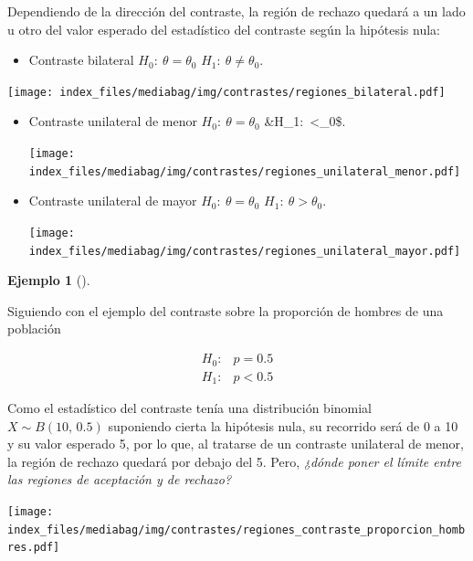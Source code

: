 \documentclass[
  a4paper,
]{scrreport}
\providecommand{\tightlist}{%
  \setlength{\itemsep}{0pt}\setlength{\parskip}{0pt}}\usepackage{longtable,booktabs,array}
\theoremstyle{plain}
\theoremstyle{definition}
\newtheorem{example}{Ejemplo}[chapter]
\theoremstyle{definition}
\theoremstyle{remark}
\begin{document}
Dependiendo de la dirección del contraste, la región de rechazo quedará
a un lado u otro del valor esperado del estadístico del contraste según
la hipótesis nula:

\begin{itemize}
\tightlist
\item
  Contraste bilateral \(H_0:\ \theta=\theta_0\)
  \(H_1:\ \theta\neq\theta_0\).
\end{itemize}

\begin{center}
\texttt{[image: index\_files/mediabag/img/contrastes/regiones\_bilateral.pdf]}
\end{center}

\begin{itemize}
\item
  Contraste unilateral de menor \(H_0:\ \theta=\theta_0\)
  \&H\_1:~\theta\textless{}\theta\_0\$. \begin{center}
  \texttt{[image: index\_files/mediabag/img/contrastes/regiones\_unilateral\_menor.pdf]}
  \end{center}
\item
  Contraste unilateral de mayor \(H_0:\ \theta=\theta_0\)
  \(H_1:\ \theta>\theta_0\). \begin{center}
  \texttt{[image: index\_files/mediabag/img/contrastes/regiones\_unilateral\_mayor.pdf]}
  \end{center}
\end{itemize}

\begin{example}[]\protect\hypertarget{exm-regiones-aceptacion-rechazo}{}\label{exm-regiones-aceptacion-rechazo}

Siguiendo con el ejemplo del contraste sobre la proporción de hombres de
una población

\begin{align*}
H_0: & p=0.5 \\
H_1: & p<0.5
\end{align*}

Como el estadístico del contraste tenía una distribución binomial
\(X\sim B(10,\,0.5)\) suponiendo cierta la hipótesis nula, su recorrido
será de 0 a 10 y su valor esperado 5, por lo que, al tratarse de un
contraste unilateral de menor, la región de rechazo quedará por debajo
del 5. Pero, \emph{¿dónde poner el límite entre las regiones de
aceptación y de rechazo?}

\begin{center}
\texttt{[image: index\_files/mediabag/img/contrastes/regiones\_contraste\_proporcion\_hombres.pdf]}
\end{center}

\end{example}
\end{document}

